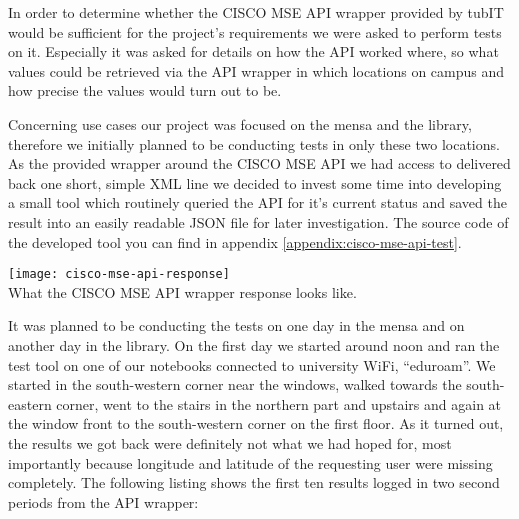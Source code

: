 In order to determine whether the CISCO MSE API wrapper provided by tubIT would be sufficient for the project's requirements we were asked to perform tests on it. Especially it was asked for details on how the API worked where, so what values could be retrieved via the API wrapper in which locations on campus and how precise the values would turn out to be.

Concerning use cases our project was focused on the mensa and the library, therefore we initially planned to be conducting tests in only these two locations. As the provided wrapper around the CISCO MSE API we had access to delivered back one short, simple XML line we decided to invest some time into developing a small tool which routinely queried the API for it's current status and saved the result into an easily readable JSON file for later investigation. The source code of the developed tool you can find in appendix \ref{appendix:cisco-mse-api-test}.

\begin{center}
    \texttt{[image: cisco-mse-api-response]}\\
    What the CISCO MSE API wrapper response looks like.
\end{center}

It was planned to be conducting the tests on one day in the mensa and on another day in the library. On the first day we started around noon and ran the test tool on one of our notebooks connected to university WiFi, \enquote{eduroam}. We started in the south-western corner near the windows, walked towards the south-eastern corner, went to the stairs in the northern part and upstairs and again at the window front to the south-western corner on the first floor. As it turned out, the results we got back were definitely not what we had hoped for, most importantly because longitude and latitude of the requesting user were missing completely. The following listing shows the first ten results logged in two second periods from the API wrapper:

